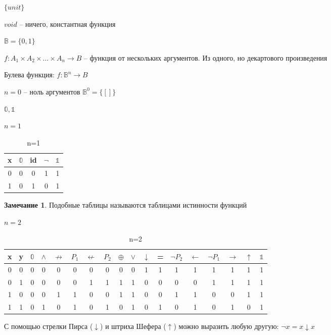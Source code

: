 \documentclass{book}
\theoremstyle{definition}
\newtheorem*{note}{Замечание}
\begin{document}
    $\{unit\}$

    $void$ -- ничего, константная функция

    $\mathbb{B} = \{0,1\}$

    $f:A_1\times A_2\times \ldots\times A_n \to B$  -- функция от нескольких аргументов. Из одного, но декартового произведения

    Булева функция: $f:\mathbb{B}^n\to B$

    $n=0$ -- ноль аргументов $\mathbb{B}^0 = \{[]\}$

    $\mathbb{0}, \mathds{1}$
     
    $n=1\quad$
    \begin{table}[htpb]
        \centering
        \caption{n=1}
        \label{tab:n1}
        \begin{tabular}{c|cccc}
            x&$\mathbb{0}$&id&$\neg$&$\mathds{1}$\\\hline
        0 &0  &0  &1  &1\\
        1&0&1&0&1 \\
        \end{tabular}
    \end{table}
   \begin{note}
       Подобные таблицы называются таблицами истинности функций
   \end{note} 
    $n=2$
    \begin{table}[htpb]
        \centering
        \caption{n=2}
        \label{tab:n2}
        \begin{tabular}{cc|cccccccccccccccc}
            x&y  & $\mathbb{0}$ & $\land$   &$\not\to $  & $P_1$ & $\not\leftarrow$ & $P_2$ &$\oplus$ & $\vee$ & $\downarrow$ & = & $\neg P_2$ & $\leftarrow$ & $\neg P_1$ & $\to $ & $\uparrow$ & $\mathds{1}$ \\\hline
         0&  0&  0& 0 & 0 & 0 & 0 & 0 & 0 & 0 & 1 & 1 & 1 & 1 & 1 &1  &1  &1 \\
         0&  1&  0&  0& 0 & 0 &1  & 1 &  1&  1& 0 & 0 & 0 & 0 &1  & 1 & 1 & 1\\
         1&  0&  0&  0&  1&  1& 0 &0  & 1 & 1 & 0 & 0 & 1 & 1 & 0 & 0 &1  &1 \\
         1&  1&  0&  1&  0&  1& 0 & 1 & 0 & 1 & 0 & 1 & 0 & 1 & 0 & 1 & 0 & 1\\
        \end{tabular}
    \end{table}

    С помощью стрелки Пирса ($\downarrow$) и штриха Шефера ($\uparrow$) можно выразить любую другую: $\neg x  = x \downarrow x$
\end{document}
